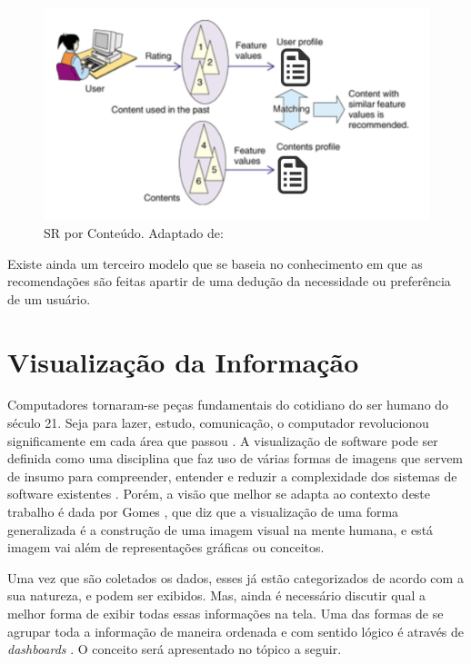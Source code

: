 \graphicspath{{figuras/}}
\begin{figure}[h]
\centering
\includegraphics[scale=0.70]{sr2.png}
\caption{SR por Conteúdo. Adaptado de: \cite{sr2}}
\label{img:sr2}
\end{figure}

 Existe ainda um terceiro modelo que se baseia no conhecimento em que as recomendações são feitas apartir de uma dedução da necessidade ou preferência de um usuário.


\section{Visualização da Informação}
Computadores tornaram-se peças fundamentais do cotidiano do ser humano do século 21. Seja para lazer, estudo, comunicação, o computador revolucionou significamente em cada área que passou \cite{hasan_humancomputer_2014}.
A visualização de software pode ser definida como uma disciplina que faz uso de várias formas de imagens que servem de insumo para compreender, entender e reduzir a complexidade dos sistemas de software existentes \cite{gracanin_software_2005}. Porém, a visão que melhor se adapta ao contexto deste trabalho é dada por Gomes \cite{gomes_percepcao_2011}, que diz que a visualização de uma forma generalizada é a construção de uma imagem visual na mente humana, e está imagem vai além de representações gráficas ou conceitos.

Uma vez que são coletados os dados, esses já estão categorizados de acordo com a sua natureza, e podem ser exibidos. Mas, ainda é necessário discutir qual a melhor forma de exibir  todas essas informações na tela. Uma das formas de se agrupar toda a informação de maneira ordenada e com sentido lógico é através de \textit{dashboards} \cite{book_design}. O conceito será apresentado no tópico a seguir.



